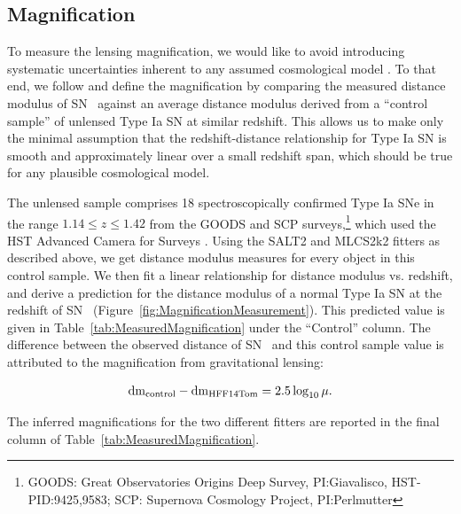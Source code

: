 \subsection{Magnification}
\label{sec:Magnification}

To measure the lensing magnification, we would like to avoid
introducing systematic uncertainties inherent to any assumed
cosmological model \citep[e.g.][]{Nordin:2014}.  To that end, we
follow \citealt{Patel:2014} and define the magnification by comparing
the measured distance modulus of SN \tomas\ against an average
distance modulus derived from a ``control sample'' of unlensed Type Ia
SN at similar redshift.  This allows us to make only the minimal
assumption that the redshift-distance relationship for Type Ia SN is
smooth and approximately linear over a small redshift span, which
should be true for any plausible cosmological model.

The unlensed sample comprises 18 spectroscopically confirmed Type Ia
SNe in the range $1.14\leq z \leq1.42$ from the GOODS and SCP
surveys,\footnote{GOODS: Great Observatories Origins Deep Survey,
PI:Giavalisco, HST-PID:9425,9583; SCP: Supernova Cosmology Project,
PI:Perlmutter} which used the HST Advanced Camera for
Surveys \citep{Riess:2006,Suzuki:2012}.  Using the SALT2 and MLCS2k2
fitters as described above, we get distance modulus measures for every
object in this control sample.  We then fit a linear relationship for
distance modulus vs. redshift, and derive a prediction for the
distance modulus of a normal Type Ia SN at the redshift of SN \tomas\
(Figure~\ref{fig:MagnificationMeasurement}).
This predicted value is given in
Table~\ref{tab:MeasuredMagnification} under the ``Control'' column.
The difference between the observed distance of SN \tomas\ and this
control sample value is attributed to the magnification from
gravitational lensing:

\begin{equation} \label{eqn:mu}
{\rm dm}_{\rm control} - {\rm dm}_{\rm HFF14Tom} = 2.5 \log_{10}\mu.
\end{equation}

\noindent The inferred magnifications for the two different fitters are
reported in the final column of Table~\ref{tab:MeasuredMagnification}.

